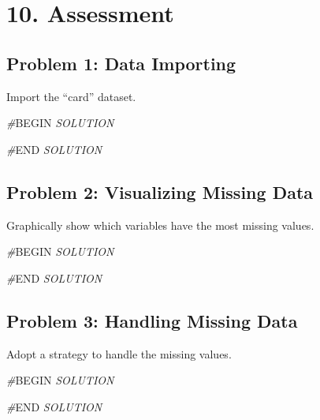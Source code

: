 \documentclass[
]{article}
\newenvironment{Shaded}{\begin{snugshade}}{\end{snugshade}}
\newcommand{\CommentTok}[1]{\textcolor[rgb]{0.56,0.35,0.01}{\textit{#1}}}
\newcommand{\RegionMarkerTok}[1]{#1}
\begin{document}
\hypertarget{assessment}{%
\section{10. Assessment}\label{assessment}}

\hypertarget{problem-1-data-importing}{%
\subsection{Problem 1: Data Importing}\label{problem-1-data-importing}}

Import the ``card'' dataset.

\begin{Shaded}
\begin{Highlighting}[]
\CommentTok{\#}\RegionMarkerTok{BEGIN}\CommentTok{ SOLUTION}

\CommentTok{\#}\RegionMarkerTok{END}\CommentTok{ SOLUTION}
\end{Highlighting}
\end{Shaded}

\hypertarget{problem-2-visualizing-missing-data}{%
\subsection{Problem 2: Visualizing Missing
Data}\label{problem-2-visualizing-missing-data}}

Graphically show which variables have the most missing values.

\begin{Shaded}
\begin{Highlighting}[]
\CommentTok{\#}\RegionMarkerTok{BEGIN}\CommentTok{ SOLUTION}

\CommentTok{\#}\RegionMarkerTok{END}\CommentTok{ SOLUTION}
\end{Highlighting}
\end{Shaded}

\hypertarget{problem-3-handling-missing-data}{%
\subsection{Problem 3: Handling Missing
Data}\label{problem-3-handling-missing-data}}

Adopt a strategy to handle the missing values.

\begin{Shaded}
\begin{Highlighting}[]
\CommentTok{\#}\RegionMarkerTok{BEGIN}\CommentTok{ SOLUTION}

\CommentTok{\#}\RegionMarkerTok{END}\CommentTok{ SOLUTION}
\end{Highlighting}
\end{Shaded}
\end{document}
